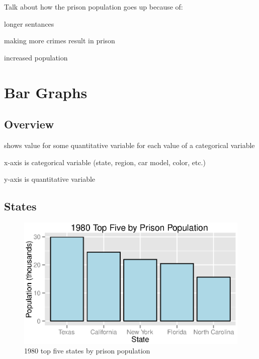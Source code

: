 \documentclass{exam}
\begin{document}
  Talk about how the prison population goes up because of:
  \begin{itemize*}
    \item longer sentances
    \item making more crimes result in prison
    \item increased population
  \end{itemize*}

  \section{Bar Graphs}

  \subsection{Overview}
  \begin{itemize*}
    \item shows value for some quantitative variable for each value of a categorical variable
    \item x-axis is categorical variable (state, region, car model, color, etc.)
    \item y-axis is quantitative variable
  \end{itemize*}

  \subsection{States}

  \begin{figure}[H]
    \centering
    \includegraphics[scale = 0.9]{figures/top_five_1980.eps}
    \caption{1980 top five states by prison population}
  \end{figure}
\end{document}
